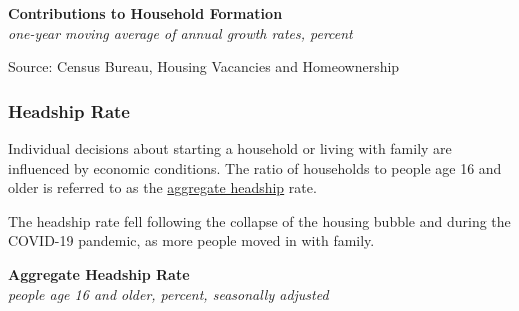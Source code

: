 \documentclass{report}
\makeatletter
\newcommand{\tbllink}[1]{\href{https://raw.githubusercontent.com/bdecon/US-chartbook/master/chartbook/data/#1}{\faTable}}
\newcommand*\short[1]{\expandafter\@gobbletwo\number\numexpr#1\relax}
\newcommand{\sbaral}[4]{
		\addplot[ybar stacked, bar width=2.3pt, draw opacity=0, fill=#1, area legend] 
			table [x=#2, y=#3, col sep=comma]{#4};}
\newcommand{\absnode}[3]{\node[below right, align=left] at (axis cs: #1,#2) {#3};}
\newcommand{\dateaxisticks}{
		date coordinates in=x, axis line style={draw=none},
		xmax={2023-11-01},
		max space between ticks=40,	    
		xtick={{1990-01-01}, {1992-01-01}, {1994-01-01}, 
			{1996-01-01}, {1998-01-01}, {2000-01-01}, 
			{2002-01-01}, {2004-01-01}, {2006-01-01},
			{2008-01-01}, {2010-01-01}, {2012-01-01}, {2014-01-01},
		    {2016-01-01}, {2018-01-01}, {2020-01-01}, {2022-01-01}, 
		    {2024-01-01}, {2026-01-01}},
		minor xtick={{1989-01-01}, {1991-01-01}, {1993-01-01},
			{1995-01-01}, {1997-01-01}, {1999-01-01}, 
			{2001-01-01}, {2003-01-01}, {2005-01-01}, {2007-01-01},
		    {2009-01-01}, {2011-01-01}, {2013-01-01}, {2015-01-01},
		    {2017-01-01}, {2019-01-01}, {2021-01-01}, {2023-01-01}, 
		    {2025-01-01}, {2027-01-01}},
		enlarge y limits={0.06}, enlarge x limits={0.01},
		}
\newcommand{\bbar}[2]{extra #1 ticks = {{#2}}, extra #1 tick labels = ,
		extra #1 tick style = {grid=major, grid style={thick, black!25}},}
\newcommand{\stdline}[4]{\addplot[very thick, no markers, color=#1] 
		table [x=#2, y=#3, col sep=comma] {#4};	}
\newcommand{\rbars}{
		\fill[color=black!10] (axis cs:{1990-07-01},\pgfkeysvalueof{/pgfplots/ymin}) rectangle 
			(axis cs:{1991-03-01}, \pgfkeysvalueof{/pgfplots/ymax});
		\fill[color=black!10] (axis cs:{2007-12-01},\pgfkeysvalueof{/pgfplots/ymin}) rectangle 
			(axis cs:{2009-07-01}, \pgfkeysvalueof{/pgfplots/ymax});
		\fill[color=black!10] (axis cs:{2001-03-01},\pgfkeysvalueof{/pgfplots/ymin}) rectangle 
			(axis cs:{2001-11-01}, \pgfkeysvalueof{/pgfplots/ymax});
		\fill[color=black!10] (axis cs:{2020-02-01},\pgfkeysvalueof{/pgfplots/ymin}) rectangle 
			(axis cs:{2020-05-01}, \pgfkeysvalueof{/pgfplots/ymax});}
\makeatother
\begin{document}
{\begin{minipage}{0.76\textwidth}

\vspace{1mm}

\normalsize \textbf{Contributions to Household Formation}\\
\footnotesize{\textit{one-year moving average of annual growth rates, percent}}
\vspace{3.8cm}

\hspace{2mm} 

\footnotesize{Source: Census Bureau, Housing Vacancies and Homeownership}  \hfill \tbllink{hhform.csv}
\end{minipage}
\newpage
\begin{minipage}{0.76\textwidth} 
\subsubsection*{Headship Rate}
\small Individual decisions about starting a household or living with family are influenced by economic conditions. The ratio of households to people age 16 and older is referred to as the \href{https://www.federalreserve.gov/econres/notes/feds-notes/an-early-evaluation-of-the-effects-of-the-pandemic-on-living-arrangements-and-household-formation-20200807.htm}{aggregate headship} rate. 
\end{minipage}

\begin{minipage}{0.25\textwidth}
\small The headship rate fell following the collapse of the housing bubble and during the COVID-19 pandemic, as more people moved in with family. 
\end{minipage}\hspace{6mm}
\begin{minipage}{0.47\textwidth}
\normalsize \textbf{Aggregate Headship Rate}\\
\footnotesize{\textit{people age 16 and older, percent, seasonally adjusted}}
\vspace{1.9cm}


\end{minipage}}
\end{document}
